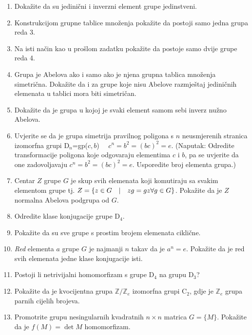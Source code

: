\begin{enumerate}[{1}.1]
\item Dokažite da su jedinični i inverzni element grupe jedinstveni.
\item Konstrukcijom grupne tablice množenja pokažite da postoji samo
jedna grupa reda 3.
\item Na isti način kao u prošlom zadatku pokažite da postoje samo
dvije grupe reda 4.
\item Grupa je Abelova ako i samo ako je njena grupna tablica množenja simetrična.
Dokažite da i za grupe koje nisu Abelove razmještaj jediničnih elemenata u tablici
mora biti simetričan.
\item Dokažite da je grupa u kojoj je svaki element samom sebi inverz nužno Abelova.
\item Uvjerite se da je grupa simetrija pravilnog poligona s $n$ neusmjerenih
stranica izomorfna grupi D$_n$=gp($c,b$) $\quad c^n = b^2 = (bc)^2 = e $.
(Naputak: Odredite transformacije poligona koje odgovaraju elementima $c$ i
 $b$, pa se uvjerite da one zadovoljavaju $c^n = b^2 = (bc)^2 = e $. Usporedite
broj elementa grupa.)\label{Dn}
\item Centar $Z$ grupe $G$ je skup svih elemenata koji komutiraju sa svakim
elementom grupe tj. $Z=\{z\in G \quad | \quad zg=gz \forall g\in G\}$. Pokažite da
je $Z$ normalna Abelova podgrupa od $G$.
\item Odredite klase konjugacije grupe D$_4$.
\item Pokažite da su sve grupe s prostim brojem elemenata ciklične.
\item \emph{Red} elementa $a$ grupe $G$ je najmanji $n$ takav da je $a^n=e$.
Pokažite da je red svih elemenata jedne klase konjugacije isti.
\item Postoji li netrivijalni homomorfizam s grupe D$_4$ na grupu D$_3$?
\item Pokažite da je kvocijentna grupa $\mathbb{Z}/\mathbb{Z}_e$
izomorfna grupi C$_2$, gdje je $\mathbb{Z}_e$ grupa parnih cijelih brojeva.
\item Promotrite grupu nesingularnih kvadratnih $n\times n$ 
matrica $G=\{M\}$. Pokažite da je $f(M)=\det M$ homomorfizam.
\end{enumerate}
